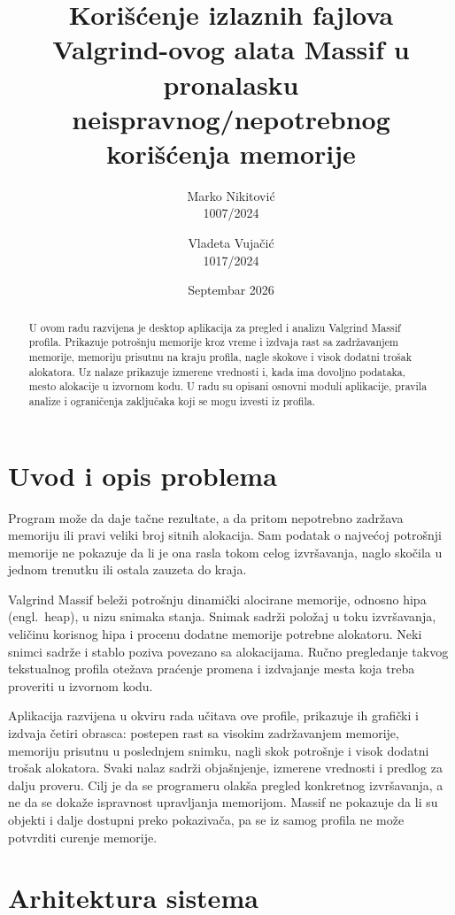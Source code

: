 \documentclass[a4paper,10pt]{article}
\title{Korišćenje izlaznih fajlova Valgrind-ovog alata Massif u pronalasku neispravnog/nepotrebnog korišćenja memorije}
\author{Marko Nikitović\\1007/2024 \and Vladeta Vujačić\\1017/2024}
\date{Septembar 2026}
\begin{document}
\maketitle

\begin{abstract}
U ovom radu razvijena je desktop aplikacija za pregled i analizu Valgrind Massif profila.
Prikazuje potrošnju memorije kroz vreme i izdvaja rast sa zadržavanjem memorije,
memoriju prisutnu na kraju profila, nagle skokove i visok dodatni trošak
alokatora. Uz nalaze prikazuje izmerene vrednosti i, kada ima dovoljno podataka,
mesto alokacije u izvornom kodu. U radu su opisani osnovni moduli aplikacije,
pravila analize i ograničenja zaključaka koji se mogu izvesti iz profila.
\end{abstract}

\tableofcontents

\section{Uvod i opis problema}

Program može da daje tačne rezultate, a da pritom nepotrebno zadržava memoriju
ili pravi veliki broj sitnih alokacija. Sam podatak o najvećoj potrošnji memorije
ne pokazuje da li je ona rasla tokom celog izvršavanja, naglo skočila u jednom
trenutku ili ostala zauzeta do kraja.

Valgrind Massif beleži potrošnju dinamički alocirane memorije, odnosno hipa
(engl.\ heap), u nizu snimaka stanja. Snimak sadrži položaj u toku izvršavanja,
veličinu korisnog hipa i procenu dodatne memorije potrebne alokatoru. Neki snimci
sadrže i stablo poziva povezano sa alokacijama. Ručno pregledanje takvog
tekstualnog profila otežava praćenje promena i izdvajanje mesta koja treba
proveriti u izvornom kodu.

Aplikacija razvijena u okviru rada učitava ove profile, prikazuje ih grafički i izdvaja četiri obrasca:
postepen rast sa visokim zadržavanjem memorije, memoriju prisutnu u poslednjem
snimku, nagli skok potrošnje i visok dodatni trošak alokatora. Svaki nalaz sadrži
objašnjenje, izmerene vrednosti i predlog za dalju proveru. Cilj je da se
programeru olakša pregled konkretnog izvršavanja, a ne da se dokaže ispravnost
upravljanja memorijom. Massif ne pokazuje da li su objekti i dalje dostupni preko
pokazivača, pa se iz samog profila ne može potvrditi curenje memorije.

\section{Arhitektura sistema}
\end{document}
